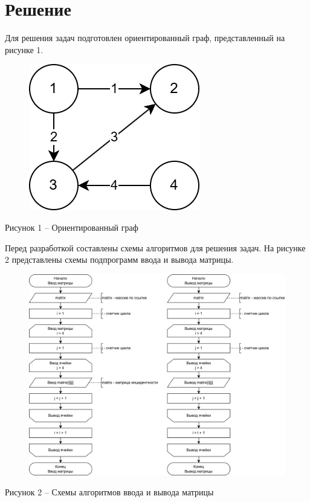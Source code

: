 \documentclass[a4paper,14pt]{extarticle}
\begin{document}
  \section*{\hspace{12.5mm}Решение}

  Для решения задач подготовлен ориентированный граф, представленный на рисунке 1.

  \begin{figure}[h]
    \centering
    \includegraphics[width=0.4\linewidth]{images/graph.png}
  \end{figure}
  \begin{center}
    Рисунок 1 – Ориентированный граф
  \end{center}

  \pagebreak
  Перед разработкой составлены схемы алгоритмов для решения задач. На рисунке 2 представлены схемы подпрограмм ввода и вывода матрицы.

  \begin{figure}[h]
    \centering
    \includegraphics[width=1\linewidth]{images/s-1.png}
  \end{figure}
  \begin{center}
    Рисунок 2 – Схемы алгоритмов ввода и вывода матрицы
  \end{center}
\end{document}
